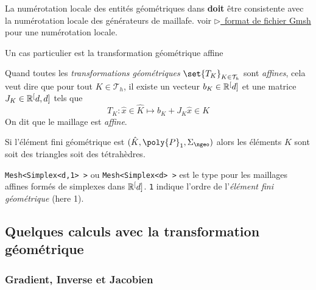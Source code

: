 
\begin{remark}
  \label{rem:15}
  La numérotation locale des entités géométriques dans \Feel \textbf{doit}
  être consistente avec la numérotation locale des générateurs de
  maillafe. voir
  \href{http://www.geuz.org/gmsh/doc/texinfo/gmsh.html#Node-ordering}{\color{blue}$\triangleright$~format
  de fichier Gmsh} pour une numérotation locale.
\end{remark}


Un cas particulier est la transformation géométrique affine

\begin{definition}
  \label{def:33}
  Quand toutes les  \emph{transformations géométriques} $\set{T_K}_{K \in
  \mathcal{T}_h}$ sont \emph{affines}, cela veut dire que pour tout $K \in
  \mathcal{T}_h$, il existe un  vecteur $b_K \in \mathbb R^{[}d]$ et une matrice $J_K \in
  \mathbb R^{[}{d,d}]$ tels que
  \begin{equation}
    \label{eq:39}
    T_K : \hat{x} \in \hat{K} \mapsto b_K + J_K \hat{x}  \in K
  \end{equation}
  On dit que le maillage est \emph{affine}.
\end{definition}
\begin{remark}[Exemple]
  \label{rem:16}
  Si l'élément fini géométrique est $(\hat{K},\poly{P}_1,\Sigma_\ngeo)$ alors
  les éléments $K$ sont soit des triangles soit des tétrahèdres.
\end{remark}

\begin{remark}[\Feel]
  \label{rem:17}
  \lstinline!Mesh<Simplex<d,1> >! ou \lstinline!Mesh<Simplex<d> >! est le type
  pour les maillages affines formés de simplexes dans $\mathbb R^{[}d]$.
  \lstinline!1! indique l'ordre de l'\emph{élément fini géométrique} (here 1).
\end{remark}

\subsection{Quelques calculs avec la transformation géométrique}
\label{sec:quelq-calc-avec}

\subsubsection{Gradient, Inverse et Jacobien}
\label{sec:gradient-inverse-et}

